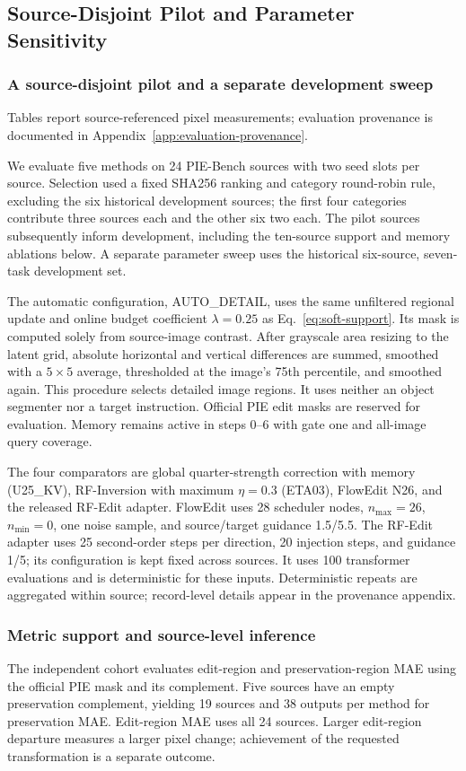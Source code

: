 \subsection{Source-Disjoint Pilot and Parameter Sensitivity}
\label{sec:independent}
\subsubsection{A source-disjoint pilot and a separate development sweep}
Tables report source-referenced pixel measurements; evaluation provenance is documented in Appendix~\ref{app:evaluation-provenance}.

We evaluate five methods on 24 PIE-Bench sources with two seed slots per source. Selection used a fixed SHA256 ranking and category round-robin rule, excluding the six historical development sources; the first four categories contribute three sources each and the other six two each. The pilot sources subsequently inform development, including the ten-source support and memory ablations below. A separate parameter sweep uses the historical six-source, seven-task development set.

The automatic configuration, AUTO\_DETAIL, uses the same unfiltered regional update and online budget coefficient $\lambda=0.25$ as Eq.~\eqref{eq:soft-support}. Its mask is computed solely from source-image contrast. After grayscale area resizing to the latent grid, absolute horizontal and vertical differences are summed, smoothed with a $5\times5$ average, thresholded at the image's 75th percentile, and smoothed again. This procedure selects detailed image regions. It uses neither an object segmenter nor a target instruction. Official PIE edit masks are reserved for evaluation. Memory remains active in steps 0--6 with gate one and all-image query coverage.

The four comparators are global quarter-strength correction with memory (U25\_KV), RF-Inversion with maximum $\eta=0.3$ (ETA03), FlowEdit N26, and the released RF-Edit adapter. FlowEdit uses 28 scheduler nodes, $n_{\max}=26$, $n_{\min}=0$, one noise sample, and source/target guidance 1.5/5.5. The RF-Edit adapter uses 25 second-order steps per direction, 20 injection steps, and guidance 1/5; its configuration is kept fixed across sources. It uses 100 transformer evaluations and is deterministic for these inputs. Deterministic repeats are aggregated within source; record-level details appear in the provenance appendix.

\subsubsection{Metric support and source-level inference}
The independent cohort evaluates edit-region and preservation-region MAE using the official PIE mask and its complement. Five sources have an empty preservation complement, yielding 19 sources and 38 outputs per method for preservation MAE. Edit-region MAE uses all 24 sources. Larger edit-region departure measures a larger pixel change; achievement of the requested transformation is a separate outcome.

